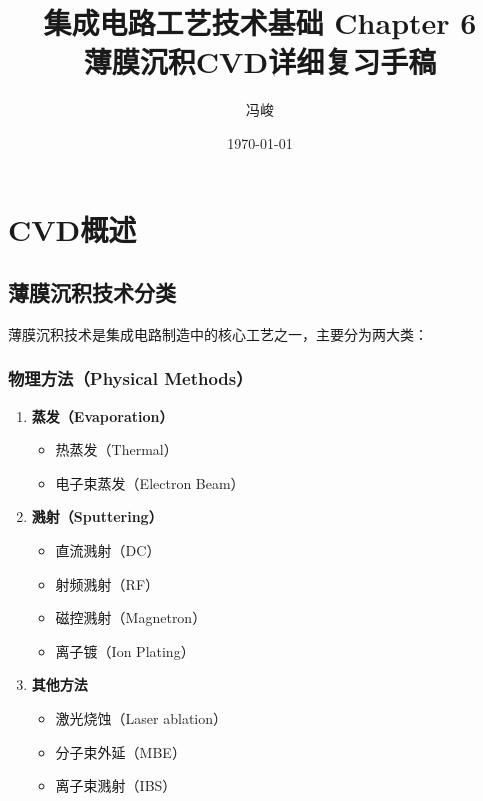 \documentclass[UTF8,12pt,a4paper]{ctexart}
\title{集成电路工艺技术基础 Chapter 6\\薄膜沉积CVD详细复习手稿}
\author{冯峻}
\date{\today}
\begin{document}
\fancyfoot[C]{\thepage}

\maketitle
\tableofcontents
\newpage  %



\section{CVD概述}

\subsection{薄膜沉积技术分类}

薄膜沉积技术是集成电路制造中的核心工艺之一，主要分为两大类：

\subsubsection{物理方法（Physical Methods）}

\begin{enumerate}
    \item \textbf{蒸发（Evaporation）}
    \begin{itemize}
        \item 热蒸发（Thermal）
        \item 电子束蒸发（Electron Beam）
    \end{itemize}
    
    \item \textbf{溅射（Sputtering）}
    \begin{itemize}
        \item 直流溅射（DC）
        \item 射频溅射（RF）
        \item 磁控溅射（Magnetron）
        \item 离子镀（Ion Plating）
    \end{itemize}
    
    \item \textbf{其他方法}
    \begin{itemize}
        \item 激光烧蚀（Laser ablation）
        \item 分子束外延（MBE）
        \item 离子束溅射（IBS）
    \end{itemize}
\end{enumerate}
\end{document}
